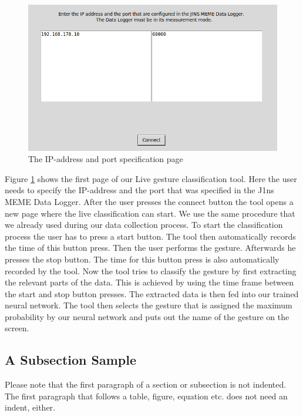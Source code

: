 \documentclass[runningheads]{llncs}
\begin{document}
\begin{center}
\begin{figure}
\includegraphics[width=\textwidth]{Live_Classification_IP.png}
\caption{The IP-address and port specification page}
\label{fig:ipandport}
\end{figure}
\end{center}

Figure \ref{fig:ipandport} shows the first page of our Live gesture classification tool. Here the user needs to specify the IP-address and the port that was specified in the J1ns MEME Data Logger. After the user presses the connect button the tool opens a new page where the live classification can start. We use the same procedure that we already used during our data collection process. To start the classification process the user has to press a start button. The tool then automatically records the time of this button press. Then the user performs the gesture. Afterwards he presses the stop button. The time for this button press is also automatically recorded by the tool. Now the tool tries to classify the gesture by first extracting the relevant parts of the data. This is achieved by using the time frame between the start and stop button presses. The extracted data is then fed into our trained neural network. The tool then selects the gesture that is assigned the maximum probability by our neural network and puts out the name of the gesture on the screen.
\subsection{A Subsection Sample}
Please note that the first paragraph of a section or subsection is
not indented. The first paragraph that follows a table, figure,
equation etc. does not need an indent, either.
\end{document}
